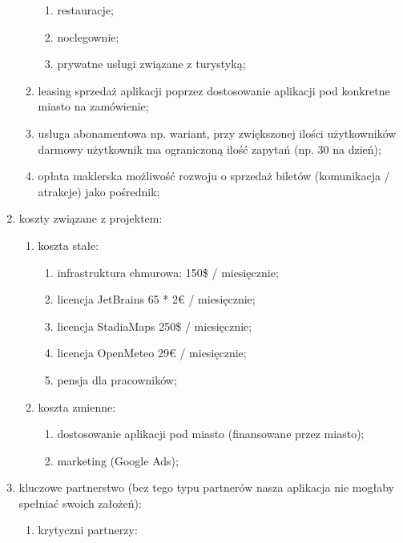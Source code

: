 \begin{enumerate}[label=\Roman*.]
\begin{enumerate}[label=\alph*.]
        \begin{enumerate}[label=\roman*.]
            \item restauracje;
            \item noclegownie;
            \item prywatne usługi związane z turystyką;
        \end{enumerate}
        \item leasing sprzedaż aplikacji poprzez dostosowanie aplikacji pod konkretne miasto na zamówienie;
        \item usługa abonamentowa np. wariant, przy zwiększonej ilości użytkowników darmowy użytkownik ma ograniczoną ilość zapytań (np. 30 na dzień);
        \item opłata maklerska możliwość rozwoju o sprzedaż biletów (komunikacja / atrakcje) jako pośrednik;
    \end{enumerate}
    \item koszty związane z projektem:
    \begin{enumerate}[label=\alph*.]
        \item koszta stałe:
        \begin{enumerate}[label=\roman*.]
            \item infrastruktura chmurowa: 150\$ / miesięcznie;
            \item licencja JetBrains 65 * 2€ / miesięcznie;
            \item licencja StadiaMaps 250\$ / miesięcznie;
            \item licencja OpenMeteo 29€ / miesięcznie;
            \item pensja dla pracowników;
        \end{enumerate}
        \item koszta zmienne:
        \begin{enumerate}[label=\roman*.]
        \item dostosowanie aplikacji pod miasto (finansowane przez miasto);
        \item marketing (Google Ads);
        \end{enumerate}
    \end{enumerate}
    \item kluczowe partnerstwo (bez tego typu partnerów nasza aplikacja nie mogłaby spełniać swoich założeń):
    \begin{enumerate}[label=\alph*.]
        \item krytyczni partnerzy:
        \begin{enumerate}[label=\roman*.]

\end{enumerate}
\end{enumerate}
\end{enumerate}
